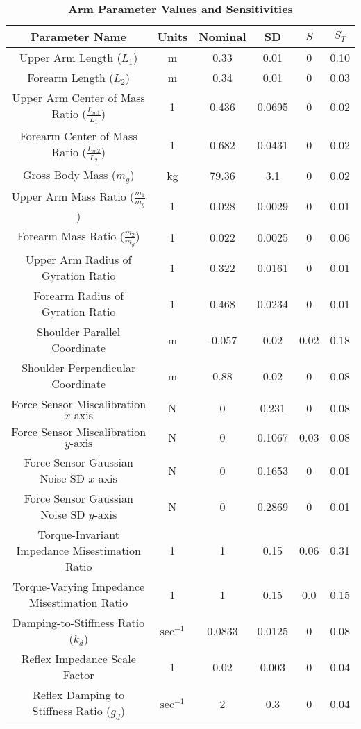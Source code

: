 \documentclass[10pt]{article}
\begin{document}
\begin{table}[!ht]
\caption{
\bf{Arm Parameter Values and Sensitivities}}
\begin{tabular}{|c|c|c c|c c|}
\hline
Parameter Name &
Units &
Nominal &
SD &
$S$ &
$S_T$ \\ \hline
Upper Arm Length ($L_1$) &
m &
0.33 &
0.01 &
0 &
0.10 \\
Forearm Length ($L_2$) &
m &
0.34 &
0.01 &
0 &
0.03 \\
Upper Arm Center of Mass Ratio ($\frac{L_{m1}}{L_1}$) &
1 &
0.436 &
0.0695 &
0 &
0.02 \\
Forearm Center of Mass Ratio ($\frac{L_{m2}}{L_2}$) &
1 &
0.682 &
0.0431 &
0 &
0.02 \\
Gross Body Mass ($m_g$) &
kg &
79.36 &
3.1 &
0 &
0.02 \\
Upper Arm Mass Ratio ($\frac{m_1}{m_g}$) &
1 &
0.028 &
0.0029 &
0 &
0.01 \\
Forearm Mass Ratio ($\frac{m_2}{m_g}$) &
1 &
0.022 &
0.0025 &
0 &
0.06 \\
Upper Arm Radius of Gyration Ratio &
1 &
0.322 &
0.0161 &
0 &
0.01 \\
Forearm Radius of Gyration Ratio &
1 &
0.468 &
0.0234 &
0 &
0.01 \\
Shoulder Parallel Coordinate &
m &
-0.057 &
0.02 &
0.02 &
0.18 \\
Shoulder Perpendicular Coordinate &
m &
0.88 &
0.02 &
0 &
0.08 \\
Force Sensor Miscalibration $x\text{-axis}$ &
N &
0 &
0.231 &
0 &
0.08 \\
Force Sensor Miscalibration $y\text{-axis}$ &
N &
0 &
0.1067 &
0.03 &
0.08 \\
Force Sensor Gaussian Noise SD $x\text{-axis}$ &
N &
0 &
0.1653 &
0 &
0.01 \\
Force Sensor Gaussian Noise SD $y\text{-axis}$ &
N &
0 &
0.2869 &
0 &
0.01 \\
Torque-Invariant Impedance Misestimation Ratio &
1 &
1 &
0.15 &
0.06 &
0.31 \\
Torque-Varying Impedance Misestimation Ratio &
1 &
1 &
0.15 &
0.0 &
0.15 \\
Damping-to-Stiffness Ratio ($k_d$) &
$\text{sec}^{-1}$ &
0.0833 &
0.0125 &
0 &
0.08 \\
Reflex Impedance Scale Factor &
1 &
0.02 &
0.003 &
0 &
0.04 \\
Reflex Damping to Stiffness Ratio ($g_d$) &
$\text{sec}^{-1}$ &
2 &
0.3 &
0 &
0.04 \\ \hline
\end{tabular}

\end{table}
\end{document}
